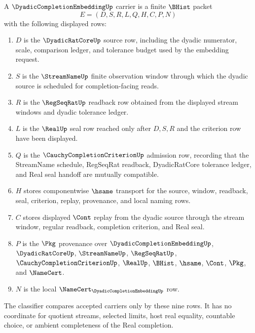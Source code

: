 \begin{definition}
\label{def:dyadic-completion-embedding-carrier}
A $\DyadicCompletionEmbeddingUp$ carrier is a finite $\BHist$ packet
$$
E=(D,S,R,L,Q,H,C,P,N)
$$
with the following displayed rows:
\begin{enumerate}
\item $D$ is the $\DyadicRatCoreUp$ source row, including the dyadic numerator, scale, comparison ledger, and tolerance budget used by the embedding request.
\item $S$ is the $\StreamNameUp$ finite observation window through which the dyadic source is scheduled for completion-facing reads.
\item $R$ is the $\RegSeqRatUp$ readback row obtained from the displayed stream windows and dyadic tolerance ledger.
\item $L$ is the $\RealUp$ seal row reached only after $D,S,R$ and the criterion row have been displayed.
\item $Q$ is the $\CauchyCompletionCriterionUp$ admission row, recording that the StreamName schedule, RegSeqRat readback, DyadicRatCore tolerance ledger, and Real seal handoff are mutually compatible.
\item $H$ stores componentwise $\hsame$ transport for the source, window, readback, seal, criterion, replay, provenance, and local naming rows.
\item $C$ stores displayed $\Cont$ replay from the dyadic source through the stream window, regular readback, completion criterion, and Real seal.
\item $P$ is the $\Pkg$ provenance over $\DyadicCompletionEmbeddingUp$, $\DyadicRatCoreUp$, $\StreamNameUp$, $\RegSeqRatUp$, $\CauchyCompletionCriterionUp$, $\RealUp$, $\BHist$, $\hsame$, $\Cont$, $\Pkg$, and $\NameCert$.
\item $N$ is the local $\NameCert_{\DyadicCompletionEmbeddingUp}$ row.
\end{enumerate}
The classifier compares accepted carriers only by these nine rows. It has no coordinate for quotient streams, selected limits, host real equality, countable choice, or ambient completeness of the Real completion.
\end{definition}

